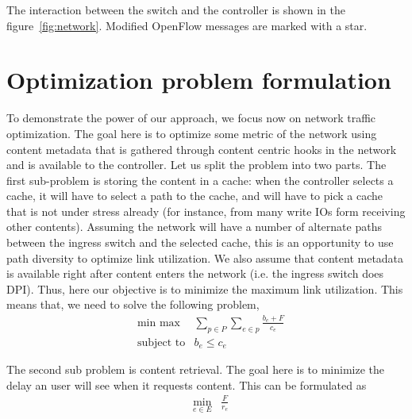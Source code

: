 \documentclass[conference]{IEEEtran}
\begin{document}
The interaction between the switch and the controller is shown in the figure~\ref{fig:network}. Modified OpenFlow messages are marked with a star.




\section{Optimization problem formulation}
\label{sec:optimization}
To demonstrate the power of our approach, we focus now
on network traffic optimization. The goal here is to optimize
some metric of the network using content metadata that is
gathered through content centric hooks in the network and
is available to the controller. Let us split the problem into
two parts. The first sub-problem is storing the content in a
cache: when the controller selects a cache, it will have to
select a path to the cache, and will have to pick a cache that
is not under stress already (for instance, from many write
IOs form receiving other contents). Assuming the network
will have a number of alternate paths between the ingress
switch and the selected cache, this is an opportunity to use
path diversity to optimize link utilization. We also assume
that content metadata is available right after content enters
the network (i.e. the ingress switch does DPI). Thus, here our
objective is to minimize the maximum link utilization. This
means that, we need to solve the following problem,
\begin{equation*}
\begin{aligned}
& \underset{}{\text{min max}}
& \sum_{p \in P} \sum_{e \in p} \frac{b_e + F}{c_e}\\
& \text{subject to}
& b_e \le c_e
\end{aligned}
\end{equation*}

The second sub problem is content retrieval. The goal here is to minimize the delay an user will see when it requests content. This can be formulated as
\begin{equation*}
\begin{aligned}
& \underset{e \in E}{\text{min}}
& \frac{F}{r_e}
\end{aligned}
\end{equation*}
\end{document}
